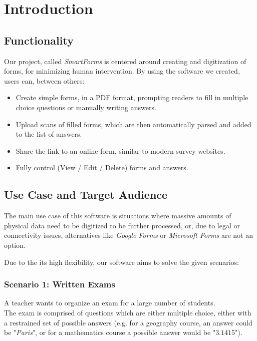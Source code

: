 \documentclass[12pt, a4paper]{report}
\begin{document}
\tableofcontents

\cleardoublepage
\pagestyle{main}
\let\ps@plain\ps@main


\chapter{Introduction}

\section{Functionality}

Our project, called \textit{SmartForms} is centered around creating and digitization of forms, for minimizing human intervention. By using the software we created, users can, between others:
\begin{itemize}
    \item Create simple forms, in a PDF format, prompting readers to fill in multiple choice questions or manually writing answers.
    \item Upload scans of filled forms, which are then automatically parsed and added to the list of answers.
    \item Share the link to an online form, similar to modern survey websites.
    \item Fully control (View / Edit / Delete) forms and answers.
\end{itemize}

\section{Use Case and Target Audience}

The main use case of this software is situations where massive amounts of physical data need to be digitized to be further processed, or, due to legal or connectivity issues, alternatives like \textit{Google Forms} or \textit{Microsoft Forms} are not an option.

Due to the its high flexibility, our software aims to solve the given scenarios:

\subsection*{Scenario 1: Written Exams}

A teacher wants to organize an exam for a large number of students.\\
The exam is comprised of questions which are either multiple choice, either with a restrained set of possible answers (e.g. for a geography course, an answer could be "\textit{Paris}", or for a mathematics course a possible answer would be "$3.1415$").
\end{document}
